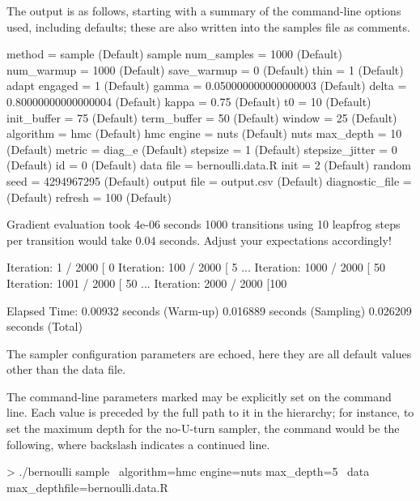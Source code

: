 \documentclass[article]{jss}
\begin{document}
The output is as follows, starting with a summary of the command-line
options used, including defaults;  these are also written into the 
samples file as comments.
%
\begin{Code}
 method = sample (Default)
   sample
     num_samples = 1000 (Default)
     num_warmup = 1000 (Default)
     save_warmup = 0 (Default)
     thin = 1 (Default)
     adapt
       engaged = 1 (Default)
       gamma = 0.050000000000000003 (Default)
       delta = 0.80000000000000004 (Default)
       kappa = 0.75 (Default)
       t0 = 10 (Default)
       init_buffer = 75 (Default)
       term_buffer = 50 (Default)
       window = 25 (Default)
     algorithm = hmc (Default)
       hmc
         engine = nuts (Default)
           nuts
             max_depth = 10 (Default)
         metric = diag_e (Default)
         stepsize = 1 (Default)
         stepsize_jitter = 0 (Default)
 id = 0 (Default)
 data
   file = bernoulli.data.R
 init = 2 (Default)
 random
   seed = 4294967295 (Default)
 output
   file = output.csv (Default)
   diagnostic_file =  (Default)
   refresh = 100 (Default)

Gradient evaluation took 4e-06 seconds
1000 transitions using 10 leapfrog steps per transition would take
0.04 seconds.
Adjust your expectations accordingly!

Iteration:    1 / 2000 [  0%
Iteration:  100 / 2000 [  5%
...
Iteration: 1000 / 2000 [ 50%
Iteration: 1001 / 2000 [ 50%
...
Iteration: 2000 / 2000 [100%

  Elapsed Time: 0.00932 seconds (Warm-up)
                0.016889 seconds (Sampling)
                0.026209 seconds (Total)
\end{Code}
%
The sampler configuration parameters are echoed, here they are all
default values other than the data file.  

The command-line parameters marked  may be explicitly
set on the command line.  Each value is preceded by the full path to
it in the hierarchy; for instance, to set the maximum depth for the
no-U-turn sampler, the command would be the following, where backslash
indicates a continued line.
%
\begin{CodeChunk}
\begin{CodeInput}
> ./bernoulli sample  \
  algorithm=hmc engine=nuts max_depth=5  \
  data max_depthfile=bernoulli.data.R
\end{CodeInput}
\end{CodeChunk}
%
\end{document}
